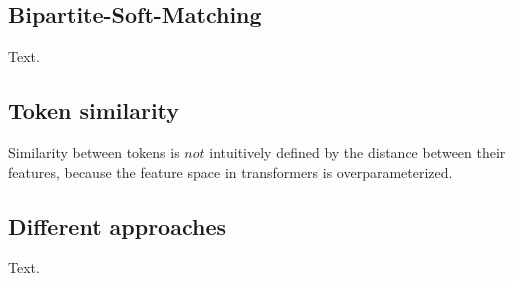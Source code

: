 \subsection{Bipartite-Soft-Matching}
Text.

\subsection{Token similarity}
Similarity between tokens is \(not\) intuitively defined by the distance between their features, because the feature space in transformers is  overparameterized.

\subsection{Different approaches}
Text.

